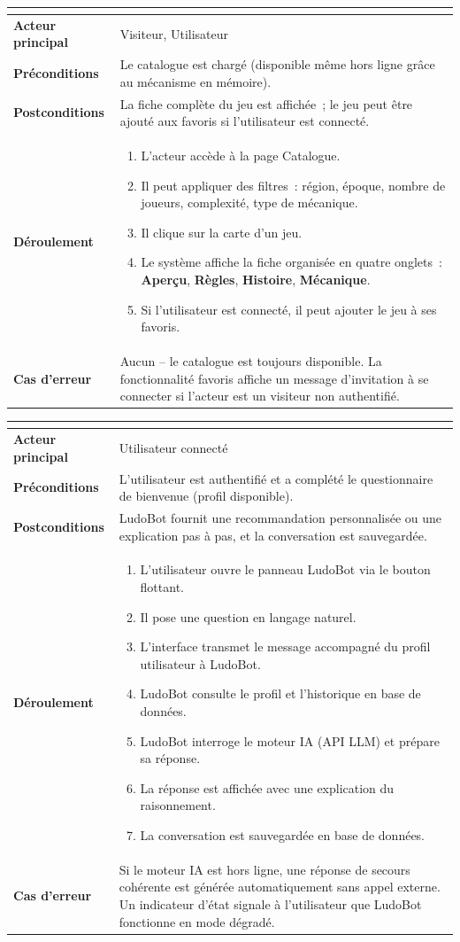 \documentclass[12pt,a4paper]{report}
\newcommand{\uctable}[7]{%
\renewcommand{\arraystretch}{1.55}
\begin{tabular}{|>{\bfseries\color{darkgray}}p{3.8cm}|p{10cm}|}
\hline
\multicolumn{2}{|l|}{\cellcolor{#1!18}\textbf{\textcolor{#1}{#2}}} \\
\hline
Acteur principal   & #3 \\
\hline
Préconditions      & #4 \\
\hline
Postconditions     & #5 \\
\hline
Déroulement        & #6 \\
\hline
Cas d'erreur       & #7 \\
\hline
\end{tabular}
\renewcommand{\arraystretch}{1}}
\begin{document}
\bigskip

\noindent\uctable{ucgreen}%
  {UC2 -- Consulter le catalogue et la fiche d'un jeu}%
  {Visiteur, Utilisateur}%
  {Le catalogue est chargé (disponible même hors ligne grâce au mécanisme en mémoire).}%
  {La fiche complète du jeu est affichée~; le jeu peut être ajouté aux favoris si l'utilisateur
   est connecté.}%
  {\begin{enumerate}[leftmargin=1.2em,topsep=0pt,itemsep=1pt]
     \item L'acteur accède à la page Catalogue.
     \item Il peut appliquer des filtres~: région, époque, nombre de joueurs, complexité,
           type de mécanique.
     \item Il clique sur la carte d'un jeu.
     \item Le système affiche la fiche organisée en quatre onglets~: \textbf{Aperçu},
           \textbf{Règles}, \textbf{Histoire}, \textbf{Mécanique}.
     \item Si l'utilisateur est connecté, il peut ajouter le jeu à ses favoris.
   \end{enumerate}}%
  {Aucun -- le catalogue est toujours disponible. La fonctionnalité favoris affiche
   un message d'invitation à se connecter si l'acteur est un visiteur non authentifié.}

\bigskip

\noindent\uctable{ucamber}%
  {UC3 -- Obtenir une recommandation ou une explication de LudoBot}%
  {Utilisateur connecté}%
  {L'utilisateur est authentifié et a complété le questionnaire de bienvenue (profil disponible).}%
  {LudoBot fournit une recommandation personnalisée ou une explication pas à pas, et
   la conversation est sauvegardée.}%
  {\begin{enumerate}[leftmargin=1.2em,topsep=0pt,itemsep=1pt]
     \item L'utilisateur ouvre le panneau LudoBot via le bouton flottant.
     \item Il pose une question en langage naturel.
     \item L'interface transmet le message accompagné du profil utilisateur à LudoBot.
     \item LudoBot consulte le profil et l'historique en base de données.
     \item LudoBot interroge le moteur IA (API LLM) et prépare sa réponse.
     \item La réponse est affichée avec une explication du raisonnement.
     \item La conversation est sauvegardée en base de données.
   \end{enumerate}}%
  {Si le moteur IA est hors ligne, une réponse de secours cohérente est générée
   automatiquement sans appel externe. Un indicateur d'état signale à l'utilisateur
   que LudoBot fonctionne en mode dégradé.}
\end{document}
